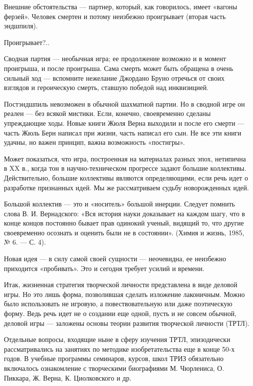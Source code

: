 Внешние  обстоятельства  —  партнер, который,  как  говорилось,  имеет
«вагоны  ферзей».  Человек  смертен  и  потому  неизбежно  проигрывает
(вторая часть эндшпиля).

Проигрывает?..

Сводная партия  — необычная игра;  ее продолжение возможно и  в момент
проигрыша, и после проигрыша. Сама  смерть может быть обращена в очень
сильный ход  — вспомните  нежелание Джордано  Бруно отречься  от своих
взглядов и героическую смерть, ставшую победой над инквизицией.

Постэндшпиль невозможен в обычной шахматной  партии. Но в сводной игре
он реален  — без всякой  мистики. Если, конечно,  своевременно сделаны
упреждающие ходы. Новые книги Жюля Верна выходили и после его смерти —
часть Жюль Берн  написал при жизни, часть написал его  сын. Не все эти
книги удачны, но важен принцип, важна возможность «постигры».


Может  показаться, что  игра, построенная  на материалах  разных эпох,
нетипична в  XX в.,  когда тон  в научно-техническом  прогрессе задают
большие   коллективы.  Действительно,   большие  коллективы   являются
определяющими,  если речь  идет о  разработке признанных  идей. Мы  же
рассматриваем судьбу новорожденных идей.

Большой коллектив — это и  «носитель» большой инерции. Следует помнить
слова В. И. Вернадского: «Вся история науки доказывает на каждом шагу,
что в конце концов постоянно  бывает прав одинокий ученый, видящий то,
что  другие своевременно  осознать  и оценить  были  не в  состоянии».
(Химия и жизнь, 1985, № 6. — С. 4).

Новая идея  — в силу самой  своей сущности — неочевидна,  ее неизбежно
приходится «пробивать». Это и сегодня требует усилий и времени.


Итак,  жизненная стратегия  творческой  личности  представлена в  виде
деловой  игры.  Но  это  лишь  форма,  позволившая  сделать  изложение
лаконичным. Можно  было использовать  не игровую,  а повествовательную
или даже  поэтическую форму. Ведь речь  идет не о создании  еще одной,
пусть  и не  совсем обычной,  деловой  игры —  заложены основы  теории
развития творческой личности (ТРТЛ).

Отдельные вопросы,  входящие ныне в сферу  изучения ТРТЛ, эпизодически
рассматривались  на  занятиях  по   методике  изобретательства  еще  в
конце 50-х  годов. В  учебные программы  семинаров, курсов,  школ ТРИЗ
обязательно  включалось  ознакомление  с  творческими  биографиями  М.
Чюрлениса, О. Пиккара, Ж. Верна, К. Циолковского и др.


